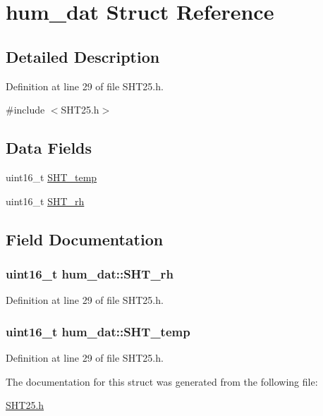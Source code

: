 \hypertarget{structhum__dat}{\section{hum\-\_\-dat Struct Reference}
\label{structhum__dat}
}


\subsection{Detailed Description}


Definition at line 29 of file S\-H\-T25.\-h.



{\ttfamily \#include $<$S\-H\-T25.\-h$>$}

\subsection*{Data Fields}
\begin{DoxyCompactItemize}
\item 
uint16\-\_\-t \hyperlink{structhum__dat_aa15c75cdb4ef31285f18b0ffde07aa5d}{S\-H\-T\-\_\-temp}
\item 
uint16\-\_\-t \hyperlink{structhum__dat_a416aba8172f9b99a1422b22063c7ac2d}{S\-H\-T\-\_\-rh}
\end{DoxyCompactItemize}


\subsection{Field Documentation}
\hypertarget{structhum__dat_a416aba8172f9b99a1422b22063c7ac2d}{
\subsubsection[{S\-H\-T\-\_\-rh}]{\setlength{\rightskip}{0pt plus 5cm}uint16\-\_\-t hum\-\_\-dat\-::\-S\-H\-T\-\_\-rh}}\label{structhum__dat_a416aba8172f9b99a1422b22063c7ac2d}


Definition at line 29 of file S\-H\-T25.\-h.

\hypertarget{structhum__dat_aa15c75cdb4ef31285f18b0ffde07aa5d}{
\subsubsection[{S\-H\-T\-\_\-temp}]{\setlength{\rightskip}{0pt plus 5cm}uint16\-\_\-t hum\-\_\-dat\-::\-S\-H\-T\-\_\-temp}}\label{structhum__dat_aa15c75cdb4ef31285f18b0ffde07aa5d}


Definition at line 29 of file S\-H\-T25.\-h.



The documentation for this struct was generated from the following file\-:\begin{DoxyCompactItemize}
\item 
\hyperlink{SHT25_8h}{S\-H\-T25.\-h}\end{DoxyCompactItemize}
